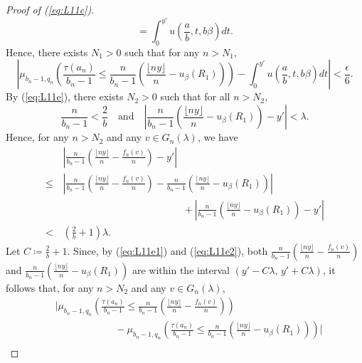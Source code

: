 \begin{proof}[Proof of (\ref{eq:L11c})]
\[= \int_{0}^{y'} u\left(\frac{a}{b}, t, b \beta\right)dt.
\]
Hence, there exists $N_1 >0$ such that for any $n > N_1$,
\begin{equation}
\textstyle\left|\mu_{b_n -1, q_n} \left( \frac{\tau(a_n)}{b_n -1} \le \frac{n}{b_n -1} \left( \frac{\lfloor n y \rfloor}{n} - u_{\beta}(R_1) \right) \right) - \int_{0}^{y'} u\left(\frac{a}{b}, t, b \beta\right)dt \right| < \frac{\epsilon}{6}. \label{eq:L11e0}
\end{equation}
By (\ref{eq:L11e}), there exists $N_2 > 0$ such that for all $n > N_2$,
\begin{equation}
\textstyle\frac{n}{b_n -1} < \frac{2}{b} \quad
 \text{and} \quad \left| \frac{n}{b_n -1} \left( \frac{\lfloor n y \rfloor}{n} - u_{\beta}(R_1) \right) - y' \right| < \lambda. \label{eq:L11e1}
\end{equation}
Hence, for any $n > N_2$ and any $v \in G_n(\lambda)$, we have
\begin{align}
  & \textstyle\left| \frac{n}{b_n -1} \left( \frac{\lfloor n y \rfloor}{n} - \frac{f_n(v)}{n} \right) - y' \right| \label{eq:L11e2}\\
 \le\,& \textstyle\left| \frac{n}{b_n -1} \left( \frac{\lfloor n y \rfloor}{n} - \frac{f_n(v)}{n} \right) -
        \frac{n}{b_n -1} \left( \frac{\lfloor n y \rfloor}{n} - u_{\beta}(R_1) \right) \right| \nonumber\\
    & \qquad\qquad\qquad\qquad\qquad\qquad + \textstyle\left| \frac{n}{b_n -1} \left( \frac{\lfloor n y \rfloor}{n} - u_{\beta}(R_1) \right) - y' \right| \nonumber\\
 < & \textstyle\left(\frac{2}{b} + 1\right) \lambda. \nonumber
\end{align}
Let $C \coloneqq \frac{2}{b} + 1$. Since, by (\ref{eq:L11e1}) and (\ref{eq:L11e2}), both $\frac{n}{b_n -1} \left( \frac{\lfloor n y \rfloor}{n} - \frac{f_n(v)}{n} \right)$ and \newline $\frac{n}{b_n -1} \left( \frac{\lfloor n y \rfloor}{n} - u_{\beta}(R_1) \right)$ are within the interval $\left(y' - C\lambda,\, y' + C\lambda \right)$, it follows that, for any $n > N_2$ and any $v \in G_n(\lambda)$,
\begin{align}
  &\textstyle\Big| \mu_{b_n -1, q_n} \left( \frac{\tau(a_n)}{b_n -1} \le
  \frac{n}{b_n -1} \left( \frac{\lfloor n y \rfloor}{n} - \frac{f_n(v)}{n} \right) \right)\label{eq:L11e3}\\
   &\qquad\qquad\qquad \textstyle -\mu_{b_n -1, q_n} \left( \frac{\tau(a_n)}{b_n -1} \le \frac{n}{b_n -1} \left( \frac{\lfloor n y \rfloor}{n} - u_{\beta}(R_1) \right) \right) \Big| \nonumber\\

\end{align}
\end{proof}
